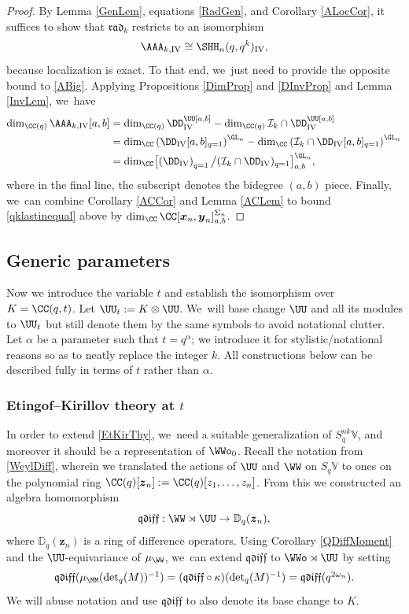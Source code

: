 \begin{proof}
By Lemma \ref{GenLem}, equations \eqref{RadGen}, and Corollary \ref{ALocCor}, it suffices to show that $\mathfrak{rad}_k$ restricts to an isomorphism
\[
\AAA_{k,\mathrm{IV}}\cong\SHH_n(q,q^k)_{\mathrm{IV}},
\]
because localization is exact.
To that end, we~just need to provide the opposite bound to \eqref{ABig}.
Applying Propositions \ref{DimProp} and \ref{DInvProp} and Lemma \ref{InvLem}, we~have
\begin{align}
\dim_{\CC(q)}\AAA_{k,\mathrm{IV}}[a,b]&=\dim_{\CC(q)}\DD_{\mathrm{IV}}^\UU[a,b]-\dim_{\CC(q)}\mathcal{I}_k\cap\DD_{\mathrm{IV}}^\UU[a,b]\nonumber\\
&= \dim_{\CC}\left(\DD_{\mathrm{IV}}[a,b]_{q=1} \right)^{\GL_n}-\dim_{\CC}\left(\mathcal{I}_k\cap\DD_{\mathrm{IV}}[a,b]_{q=1}\right)^{\GL_n}\nonumber\\
&= \dim_{\CC}\bigl[ \left(\DD_{\mathrm{IV}}\right)_{q=1}\big/(\mathcal{I}_k\cap\DD_{\mathrm{IV}})_{q=1} \bigr]^{\GL_n}_{a,b},\label{qklastinequal}
\end{align}
where in the final line, the subscript denotes the bidegree $(a,b)$ piece.
Finally, we~can combine Corollary \ref{ACCor} and Lemma \ref{ACLem} to bound \eqref{qklastinequal} above by $\dim_\CC\CC[\boldsymbol{x}_n,\boldsymbol{y}_n]_{a,b}^{\Sigma_n}$.
\end{proof}

\subsection{Generic parameters}\label{GenPar}
Now we introduce the variable $t$ and establish the isomorphism over $K=\CC(q,t)$.
Let $\UU_t:=K\otimes\UU$. We~will base change $\UU$ and all its modules to $\UU_t$ but still denote them by the same symbols to avoid notational clutter.
Let $\alpha$ be a parameter such that $t=q^\alpha$; we introduce it for stylistic/notational reasons so as to neatly replace the integer $k$.
All constructions below can be described fully in terms of $t$ rather than $\alpha$.

\subsubsection{Etingof--Kirillov theory at $t$}
In order to extend \ref{EtKirThy}, we~need a suitable generalization of $S_q^{nk}\mathbb{V}$, and moreover it should be a representation of $\WWo_0$.
Recall the notation from \ref{WeylDiff}, wherein we translated the actions of $\UU$ and $\WW$ on $S_q\mathbb{V}$ to ones on the polynomial ring $\CC(q)[\boldsymbol{z}_n]:=\CC(q)[z_1,\ldots,z_n]$.
From this we constructed an algebra homomorphism
\[
\mathfrak{qdiff}:\WW\rtimes\UU\to\mathbb{D}_q(\boldsymbol{z}_n),
\]
where $\mathbb{D}_q(\boldsymbol{z}_n)$ is a ring of difference operators.
Using Corollary \ref{QDiffMoment} and the $\UU$\nobreakdash-equi\-variance of $\mu_\WW$, we~can extend $\mathfrak{qdiff}$ to $\WWo\rtimes\UU$ by setting
\[
\mathfrak{qdiff}(\mu_\MM(\textstyle\det_q(M))^{-1})=(\mathfrak{qdiff}\circ\kappa)(\textstyle\det_q(M)^{-1})=\mathfrak{qdiff}(q^{2\omega_n}).
\]
We will abuse notation and use $\mathfrak{qdiff}$ to also denote its base change to $K$.

